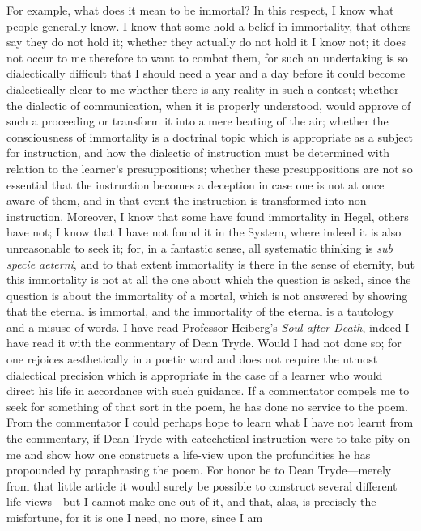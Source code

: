 \documentclass[12pt]{article}
\begin{document}
For example, what does it mean to be immortal? In this respect, I know
what people generally know. I know that some hold a belief in
immortality, that others say they do not hold it; whether they actually
do not hold it I know not; it does not occur to me therefore to want
to combat them, for such an undertaking is so dialectically difficult
that I should need a year and a day before it could become dialectically
clear to me whether there is any reality in such a contest; whether the
dialectic of communication, when it is properly understood, would
approve of such a proceeding or transform it into a mere beating of the
air; whether the consciousness of immortality is a doctrinal topic
which is appropriate as a subject for instruction, and how the dialectic
of instruction must be determined with relation to the learner's
presuppositions; whether these presuppositions are not so essential that
the instruction becomes a deception in case one is not at once aware of
them, and in that event the instruction is transformed into
non-instruction. Moreover, I know that some have found immortality in
Hegel, others have not; I know that I have not found it in the System,
where indeed it is also unreasonable to seek it; for, in a fantastic
sense, all systematic thinking is \textit{sub specie aeterni}, and to
that extent immortality is there in the sense of eternity, but this
immortality is not at all the one about which the question is asked,
since the question is about the immortality of a mortal, which is not
answered by showing that the eternal is immortal, and the immortality
of the eternal is a tautology and a misuse of words. I have read
Professor Heiberg's \textit{Soul after Death}, indeed I have read it
with the commentary of Dean Tryde. Would I had not done so; for one
rejoices aesthetically in a poetic word and does not require the utmost
dialectical precision which is appropriate in the case of a learner who
would direct his life in accordance with such guidance. If a commentator
compels me to seek for something of that sort in the poem, he has done
no service to the poem. From the commentator I could perhaps hope to
learn what I have not learnt from the commentary, if Dean Tryde with
catechetical instruction were to take pity on me and show how one
constructs a life-view upon the profundities he has propounded by
paraphrasing the poem. For honor be to Dean Tryde---merely from that
little article it would surely be possible to construct several
different life-views---but I cannot make one out of it, and that, alas,
is precisely the misfortune, for it is one I need, no more, since I am
\end{document}
